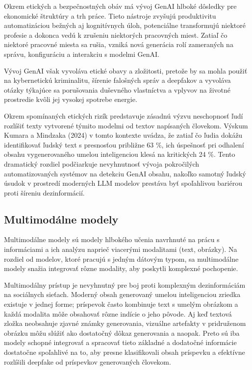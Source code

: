 \documentclass[]{tukediphc}
\begin{document}
Okrem etických a bezpečnostných obáv má vývoj GenAI hlboké dôsledky pre ekonomické štruktúry a trh práce. Tieto nástroje zvyšujú produktivitu automatizáciou bežných aj kognitívnych úloh, potenciálne transformujú niektoré profesie a dokonca vedú k zrušeniu niektorých pracovných miest. Zatiaľ čo niektoré pracovné miesta sa rušia, vzniká nová generácia rolí zameraných na správu, konfiguráciu a interakciu s modelmi GenAI.

Vývoj GenAI však vyvoláva etické obavy a zložitosti, pretože by sa mohla použiť na kybernetickú kriminalitu, šírenie falošných správ a deepfakov a vyvoláva otázky týkajúce sa porušovania duševného vlastníctva a vplyvov na životné prostredie kvôli jej vysokej spotrebe energie.

Okrem spomínaných etických rizík predstavuje zásadnú výzvu neschopnosť ľudí rozlíšiť texty vytvorené týmito modelmi od textov napísaných človekom. Výskum Kumara a Mindzaka (2024) v tomto kontexte uvádza, že zatiaľ čo ľudia dokážu identifikovať ľudský text s presnosťou približne 63 \%, ich úspešnosť pri odhalení obsahu vygenerovaného umelou inteligenciou klesá na kritických 24 \%. Tento dramatický rozdiel podčiarkuje nevyhnutnosť vývoja pokročilých automatizovaných systémov na detekciu GenAI obsahu, nakoľko samotný ľudský úsudok v prostredí moderných LLM modelov prestáva byť spoľahlivou bariérou proti šíreniu dezinformácií.\cite{Detecting_Artificial_Intelligence_Generated_Text_from_Human-Written_Text}

\subsection{Multimodálne modely}
Multimodálne modely sú modely hlbokého učenia navrhnuté na prácu s informáciami a ich analýzu naprieč viacerými modalitami (text, obrázky). Na rozdiel od modelov, ktoré pracujú s jedným dátovým typom, sa multimodálne modely snažia integrovať rôzne modality, aby poskytli komplexné pochopenie.

Multimodálny prístup je nevyhnutný pre boj proti komplexným dezinformáciám na sociálnych sieťach. Moderný obsah generovaný umelou inteligenciou zriedka existuje v jednej forme; príspevok často kombinuje text s umelým obrázkom a každá modalita môže obsahovať rôzne indície o jeho pôvode. Aj keď textová zložka neobsahuje zjavné známky generovania, vizuálne artefakty v pridruženom obrázku môžu slúžiť ako dostatočný dôkaz generovania a naopak. Preto sú iba modely schopné integrovať a spracovať tieto základné a dodatočné informácie dostatočne spoľahlivé na to, aby presne klasifikovali obsah príspevku a efektívne rozlíšili deepfake od príspevkov generovaných človekom.
\end{document}
